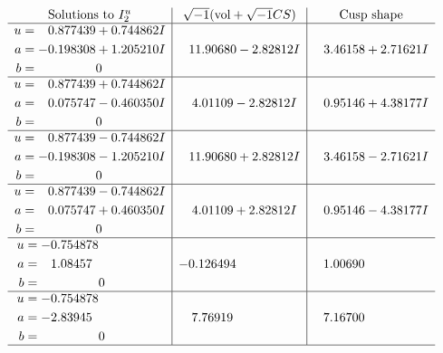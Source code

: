\documentclass[1p]{elsarticle_modified}
\theoremstyle{definition}
\newcommand{\I}{\sqrt{-1}}
\begin{document}
$$\begin{array}{c|c|c}  
\text{Solutions to }I^u_{2}& \I (\text{vol} + \sqrt{-1}CS) & \text{Cusp shape}\\
 \hline 
\begin{aligned}
u &= \phantom{-}0.877439 + 0.744862 I \\
a &= -0.198308 + 1.205210 I \\
b &= \phantom{-0.000000 } 0\end{aligned}
 & \phantom{-}11.90680 - 2.82812 I & \phantom{-}3.46158 + 2.71621 I \\ \hline\begin{aligned}
u &= \phantom{-}0.877439 + 0.744862 I \\
a &= \phantom{-}0.075747 - 0.460350 I \\
b &= \phantom{-0.000000 } 0\end{aligned}
 & \phantom{-}4.01109 - 2.82812 I & \phantom{-}0.95146 + 4.38177 I \\ \hline\begin{aligned}
u &= \phantom{-}0.877439 - 0.744862 I \\
a &= -0.198308 - 1.205210 I \\
b &= \phantom{-0.000000 } 0\end{aligned}
 & \phantom{-}11.90680 + 2.82812 I & \phantom{-}3.46158 - 2.71621 I \\ \hline\begin{aligned}
u &= \phantom{-}0.877439 - 0.744862 I \\
a &= \phantom{-}0.075747 + 0.460350 I \\
b &= \phantom{-0.000000 } 0\end{aligned}
 & \phantom{-}4.01109 + 2.82812 I & \phantom{-}0.95146 - 4.38177 I \\ \hline\begin{aligned}
u &= -0.754878\phantom{ +0.000000I} \\
a &= \phantom{-}1.08457\phantom{ +0.000000I} \\
b &= \phantom{-0.000000 } 0\end{aligned}
 & -0.126494\phantom{ +0.000000I} & \phantom{-}1.00690\phantom{ +0.000000I} \\ \hline\begin{aligned}
u &= -0.754878\phantom{ +0.000000I} \\
a &= -2.83945\phantom{ +0.000000I} \\
b &= \phantom{-0.000000 } 0\end{aligned}
 & \phantom{-}7.76919\phantom{ +0.000000I} & \phantom{-}7.16700\phantom{ +0.000000I}\\
 \hline 
 \end{array}$$\newpage\newpage\renewcommand{\arraystretch}{1}
\end{document}
